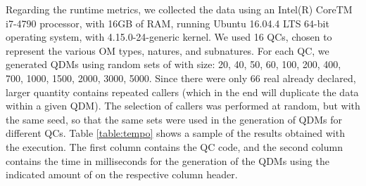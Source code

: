 
Regarding the runtime metrics, we collected the data using an Intel(R) Core{TM} i7-4790 processor, 
with 16GB of RAM, running Ubuntu 16.04.4 LTS 64-bit operating system, with 4.15.0-24-generic kernel. We used 16 QCs, 
chosen to represent the various OM types, natures, and subnatures. For each QC, we generated QDMs using 
random sets of \callers with size: 20, 40, 50, 60, 100, 200, 400, 700, 1000, 1500, 2000, 3000, 5000. 
Since there were only 66 real \callers already declared, larger quantity contains repeated callers (which in the end will duplicate 
the data within a given QDM). The selection of callers was performed at random, but with the same seed, so that the same sets were used in the 
generation of QDMs for different QCs. Table \ref{table:tempo} shows a sample of the results obtained with the execution. 
The first column contains the QC code, and the second column contains the time in milliseconds for the generation of 
the QDMs using the indicated amount of \callers on the respective column header.


